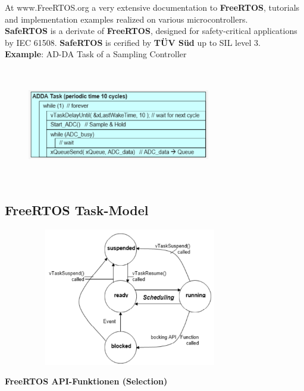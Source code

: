 At www.FreeRTOS.org a very extensive documentation to \textbf{FreeRTOS}, tutorials and implementation examples realized on various microcontrollers.\\

\textbf{SafeRTOS} is a derivate of \textbf{FreeRTOS}, designed for safety-critical applications  by IEC 61508. \textbf{SafeRTOS} is cerified by \textbf{T\"{U}V S\"{u}d} up to SIL level 3.\\

\textbf{Example}: AD-DA Task of a Sampling Controller\\

 	\begin{figure}[h]
    \centering
    \includegraphics[width=8cm, height=5cm]{Images/image131.png}
    \label{fig:Fig }
    \end{figure}
\newpage
\subsection{ FreeRTOS Task-Model}

 	\begin{figure}[h]
    \centering
    \includegraphics[width=9cm, height=6cm]{Images/image132.png}
    \label{fig:Fig }
    \end{figure}

{\rot\bf FreeRTOS API-Funktionen (Selection)}\\

